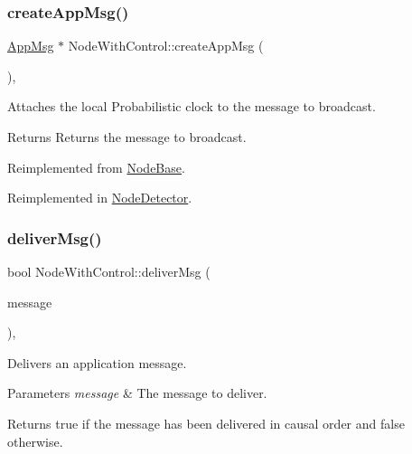 \subsubsection{\texorpdfstring{create\+App\+Msg()}{createAppMsg()}}
{\footnotesize\ttfamily \hyperlink{class_app_msg}{App\+Msg} $\ast$ Node\+With\+Control\+::create\+App\+Msg (\begin{DoxyParamCaption}{ }\end{DoxyParamCaption})\hspace{0.3cm}{\ttfamily [protected]}, {\ttfamily [virtual]}}



Attaches the local Probabilistic clock to the message to broadcast. 

\begin{DoxyReturn}{Returns}
Returns the message to broadcast. 
\end{DoxyReturn}


Reimplemented from \hyperlink{class_node_base_ac8b9e21b1cc32fd86aaa6c956b93a7c3}{Node\+Base}.



Reimplemented in \hyperlink{class_node_detector_a7100349647350ad5e3aeb1ed4669c723}{Node\+Detector}.

\mbox{\label{class_node_with_control_aada7451be61be592b27188b6249afef2}} 
\subsubsection{\texorpdfstring{deliver\+Msg()}{deliverMsg()}}
{\footnotesize\ttfamily bool Node\+With\+Control\+::deliver\+Msg (\begin{DoxyParamCaption}\item[{const \hyperlink{structures_8h_a7e7bdc1d2fff8a9436f2f352b2711ed6}{message\+Info} \&}]{message }\end{DoxyParamCaption})\hspace{0.3cm}{\ttfamily [protected]}, {\ttfamily [virtual]}}



Delivers an application message. 


\begin{DoxyParams}{Parameters}
{\em message} & The message to deliver. \\
\hline
\end{DoxyParams}
\begin{DoxyReturn}{Returns}
true if the message has been delivered in causal order and false otherwise. 
\end{DoxyReturn}


